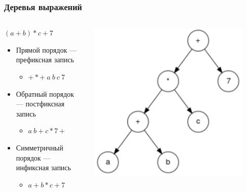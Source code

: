 \documentclass[xetex,mathserif,serif]{beamer}
\begin{document}
	\begin{frame}
		\frametitle{Деревья выражений}
		\begin{columns}
			\begin{column}{0.6\textwidth}
				$(a + b) * c + 7$
				\begin{itemize}
					\item Прямой порядок --- префиксная запись
					\begin{itemize}
						\item $+ * +\ a\ b\ c\ 7$
					\end{itemize}
					\item Обратный порядок --- постфиксная запись
					\begin{itemize}
						\item $a\ b + c * 7 +$
					\end{itemize}
					\item Симметричный порядок --- инфиксная запись
					\begin{itemize}
						\item $a + b * c + 7$
					\end{itemize}
				\end{itemize}
			\end{column}
			\begin{column}{0.4\textwidth}
				\begin{center}
					\includegraphics[width=0.9\textwidth]{expressionTree.png}
				\end{center}
			\end{column}
		\end{columns}
	\end{frame}
\end{document}
